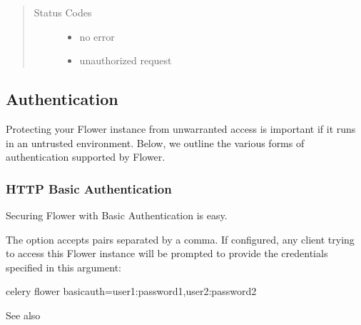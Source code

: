 \documentclass[letterpaper,10pt,english]{sphinxmanual}
\begin{document}
\begin{fulllineitems}
\begin{quote}
\begin{description}
\begin{itemize}
\end{itemize}

\item[{Status Codes}] \leavevmode\begin{itemize}
\item {} 
 \textendash{} no error

\item {} 
 \textendash{} unauthorized request

\end{itemize}

\end{description}\end{quote}

\end{fulllineitems}



\subsection{Authentication}
\label{\detokenize{auth:id1}}\label{\detokenize{auth::doc}}
Protecting your Flower instance from unwarranted access is important
if it runs in an untrusted environment. Below, we outline the various
forms of authentication supported by Flower.


\subsubsection{HTTP Basic Authentication}
\label{\detokenize{auth:http-basic-authentication}}\label{\detokenize{auth:basic-auth}}
Securing Flower with Basic Authentication is easy.

The  option accepts  pairs separated by
a comma. If configured, any client trying to access this
Flower instance will be prompted to provide the credentials specified in
this argument:

\begin{sphinxVerbatim}[commandchars=\\\{\}]
\PYGZdl{} celery flower \PYGZhy{}\PYGZhy{}basic\PYGZus{}auth=user1:password1,user2:password2
\end{sphinxVerbatim}

See also {\hyperref[\detokenize{reverse-proxy:reverse-proxy}]{}}
\end{document}
